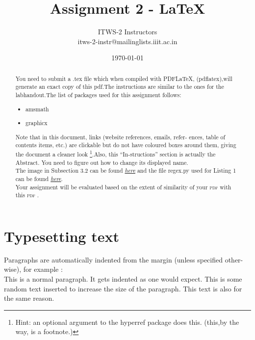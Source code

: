 \documentclass[10pt,oneside,a4paper]{article}
\title{\textbf{\Large{Assignment 2 - \LaTeX{}}}}
\author{ITWS-2 Instructors\\itws-2-instr@mailinglists.iiit.ac.in}
\date{\today}
\begin{document}
\maketitle
\renewcommand{\abstractname}{Instructions}
\begin{abstract}
\label{abstract}


You need to submit a \textsf{.tex} file which when compiled with PDF\LaTeX,
(pdflatex),will generate an exact copy of this \textsf{pdf}.The instructions are similar to the ones for the labhandout.The list of packages used for this assignment follows:
\\
\begin{multicols}{3}
\begin{itemize}
\item{amsmath}
\item{graphicx}
\end{itemize}
\end{multicols}
Note that in this document, links (website references, emails, refer-
ences, table of contents items, etc.) are clickable but do not have coloured
boxes around them, giving the document a cleaner look \footnote{Hint: an optional argument to the \textsf{hyperref} package does this. (this,by the way, is a footnote.)}.Also, this “In-structions” section is actually the Abstract. You need to figure out how to change its displayed name.\\

The image in Subsection 3.2 can be found \href{http://pascal.iiit.ac.in/~sankalp/itws2/latexassignment/latex.png}{\textit{here}} and the file \textsf{regex.py} used for Listing 1 can be found \href{http://pascal.iiit.ac.in/~sankalp/itws2/latexassignment/regex.py}{\textit{here}}.\\

Your assignment will be evaluated based on the extent of similarity of
your \textsc{pdf} with this \textsc{pdf} .
\end{abstract}
\newpage
\tableofcontents \label{contents}
\newpage
\section{Typesetting text}
Paragraphs are automatically indented from the margin (unless specified other-wise), for example :\\

This is a normal paragraph. It gets indented as one would expect. This is some random text inserted to increase the size of the paragraph. This text is also for the same reason.\label{para1}\\
\end{document}
